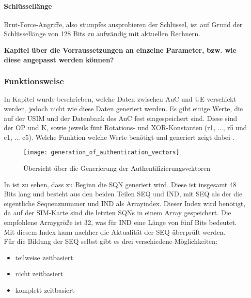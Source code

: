  \paragraph{Schlüssellänge}
 Brut-Force-Angriffe, also stumpfes ausprobieren der Schlüssel, ist auf Grund der
 Schlüssellänge von 128 Bits zu aufwändig mit aktuellen Rechnern.
 
 \textbf{Kapitel über die Vorraussetzungen an einzelne Parameter, bzw. wie diese angepasst
 werden können?}

 \subsubsection{Funktionsweise}
 In Kapitel  wurde beschrieben, welche Daten zwischen
 \ac{AuC} und \ac{UE} verschickt werden, jedoch nicht wie diese Daten generiert werden. Es
 gibt einige Werte, die auf der \ac{USIM} und der Datenbank des \ac{AuC} fest eingespeichert
 sind. Diese sind der \ac{OP} und \ac{K}, sowie jeweils fünf Rotations- und XOR-Konstanten
 (r1, ..., r5 und c1, ... c5). Welche Funktion welche Werte benötigt und generiert zeigt dabei .
 
 \begin{figure}[htp]
  \begin{center}
   \texttt{[image: generation\_of\_authentication\_vectors]}
  \end{center}
  \caption[Übersicht über die Generierung der Authentifizierungsvektoren]{Übersicht über die Generierung der Authentifizierungsvektoren \cite{3gpp.33.102}}
  \label{fig:funktionsubersicht}
 \end{figure}
 
 In  ist zu sehen, dass zu Beginn die \ac{SQN} generiert wird.
 Diese ist insgesamt 48 Bits lang und besteht aus den beiden Teilen SEQ und IND, mit SEQ als
 der die eigentliche Sequenznummer und IND als Arrayindex. Dieser Index wird benötigt, da auf
 der SIM-Karte sind die letzten SQNs in einem Array gespeichert. Die empfohlene Arraygröße ist
 32, was für IND eine Länge von fünf Bits bedeutet. Mit diesem Index kann nachher die
 Aktualität der SEQ überprüft werden.\cite{3gpp.33.102} \\
 Für die Bildung der SEQ selbst gibt es drei verschiedene Möglichkeiten:
 \begin{itemize}
  \item teilweise zeitbasiert
  \item nicht zeitbasiert
  \item komplett zeitbasiert
 \end{itemize}
 
